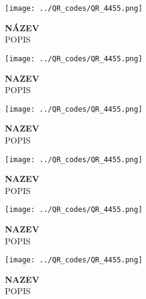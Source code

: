 \documentclass[10pt, a4paper]{article}%
\begin{document}
\noindent
\begin{minipage}[c][2.9cm][c]{1.5cm}\texttt{[image: ../QR\_codes/QR\_4455.png]}\end{minipage}\begin{minipage}[c][2.9cm][c]{4.7cm}\normalsize\textbf{NÁZEV}\\\small POPIS\end{minipage}\hspace{0.1cm}
\begin{minipage}[c][2.9cm][c]{1.5cm}\texttt{[image: ../QR\_codes/QR\_4455.png]}\end{minipage}\begin{minipage}[c][2.9cm][c]{4.7cm}\normalsize\textbf{NAZEV}\\\small POPIS\end{minipage}\hspace{0.1cm}
\begin{minipage}[c][2.9cm][c]{1.5cm}\texttt{[image: ../QR\_codes/QR\_4455.png]}\end{minipage}\begin{minipage}[c][2.9cm][c]{4.7cm}\normalsize\textbf{NAZEV}\\\small POPIS\end{minipage}\hspace{0.1cm}
\begin{minipage}[c][2.9cm][c]{1.5cm}\texttt{[image: ../QR\_codes/QR\_4455.png]}\end{minipage}\begin{minipage}[c][2.9cm][c]{4.7cm}\normalsize\textbf{NAZEV}\\\small POPIS\end{minipage}\hspace{0.1cm}
\begin{minipage}[c][2.9cm][c]{1.5cm}\texttt{[image: ../QR\_codes/QR\_4455.png]}\end{minipage}\begin{minipage}[c][2.9cm][c]{4.7cm}\normalsize\textbf{NAZEV}\\\small POPIS\end{minipage}\hspace{0.1cm}
\begin{minipage}[c][2.9cm][c]{1.5cm}\texttt{[image: ../QR\_codes/QR\_4455.png]}\end{minipage}\begin{minipage}[c][2.9cm][c]{4.7cm}\normalsize\textbf{NAZEV}\\\small POPIS\end{minipage}\hspace{0.1cm}
\end{document}

